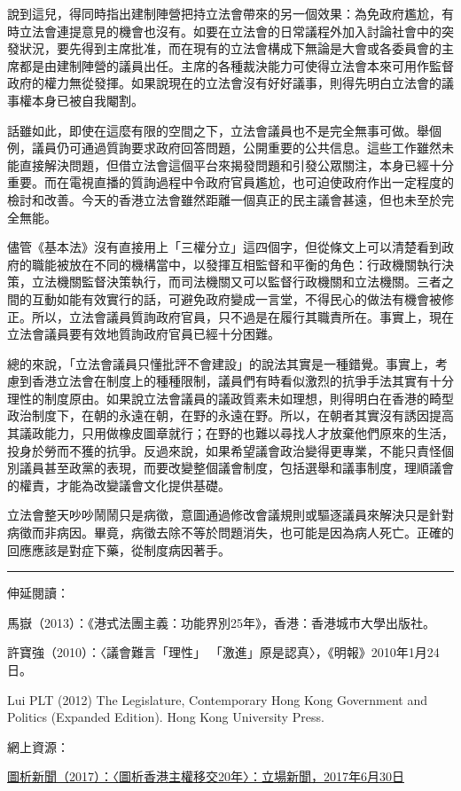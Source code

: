 說到這兒，得同時指出建制陣營把持立法會帶來的另一個效果：為免政府尷尬，有時立法會連提意見的機會也沒有。如要在立法會的日常議程外加入討論社會中的突發狀況，要先得到主席批准，而在現有的立法會構成下無論是大會或各委員會的主席都是由建制陣營的議員出任。主席的各種裁決能力可使得立法會本來可用作監督政府的權力無從發揮。如果說現在的立法會沒有好好議事，則得先明白立法會的議事權本身已被自我閹割。

話雖如此，即使在這麼有限的空間之下，立法會議員也不是完全無事可做。舉個例，議員仍可通過質詢要求政府回答問題，公開重要的公共信息。這些工作雖然未能直接解決問題，但借立法會這個平台來揭發問題和引發公眾關注，本身已經十分重要。而在電視直播的質詢過程中令政府官員尷尬，也可迫使政府作出一定程度的檢討和改善。今天的香港立法會雖然距離一個真正的民主議會甚遠，但也未至於完全無能。

儘管《基本法》沒有直接用上「三權分立」這四個字，但從條文上可以清楚看到政府的職能被放在不同的機構當中，以發揮互相監督和平衡的角色：行政機關執行決策，立法機關監督決策執行，而司法機關又可以監督行政機關和立法機關。三者之間的互動如能有效實行的話，可避免政府變成一言堂，不得民心的做法有機會被修正。所以，立法會議員質詢政府官員，只不過是在履行其職責所在。事實上，現在立法會議員要有效地質詢政府官員已經十分困難。

總的來說，「立法會議員只懂批評不會建設」的說法其實是一種錯覺。事實上，考慮到香港立法會在制度上的種種限制，議員們有時看似激烈的抗爭手法其實有十分理性的制度原由。如果說立法會議員的議政質素未如理想，則得明白在香港的畸型政治制度下，在朝的永遠在朝，在野的永遠在野。所以，在朝者其實沒有誘因提高其議政能力，只用做橡皮圖章就行；在野的也難以尋找人才放棄他們原來的生活，投身於勞而不獲的抗爭。反過來說，如果希望議會政治變得更專業，不能只責怪個別議員甚至政黨的表現，而要改變整個議會制度，包括選舉和議事制度，理順議會的權責，才能為改變議會文化提供基礎。

立法會整天吵吵鬧鬧只是病徵，意圖通過修改會議規則或驅逐議員來解決只是針對病徵而非病因。畢竟，病徵去除不等於問題消失，也可能是因為病人死亡。正確的回應應該是對症下藥，從制度病因著手。

\rule[-10pt]{15cm}{0.05em}

伸延閱讀：

馬嶽（2013）：《港式法團主義：功能界別25年》，香港：香港城市大學出版社。

許寶強（2010）：〈議會難言「理性」 「激進」原是認真〉，《明報》2010年1月24日。

Lui PLT (2012) The Legislature, Contemporary Hong Kong Government and Politics (Expanded Edition). Hong Kong University Press.

網上資源：

\href{https://thestandnews.com/politics/圖析香港主權移交20年/}{圖析新聞（2017）：〈圖析香港主權移交20年〉：立場新聞，2017年6月30日}
